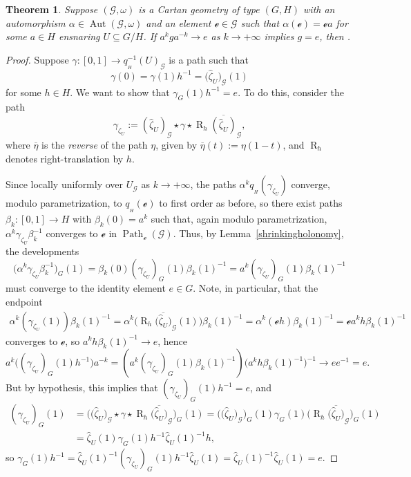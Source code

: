 \documentclass[pdftex]{sigma}
\numberwithin{equation}{section}
\newtheorem{Theorem}{Theorem}[section]
\theoremstyle{definition}
\DeclareMathOperator{\Hol}{\mathrm{Hol}}
\DeclareMathOperator{\Aut}{\mathrm{Aut}}
\DeclareMathOperator{\Path}{Path}
\newcommand{\Rt}[1]{\operatorname{R}_{#1}}
\begin{document}
\begin{Theorem}\label{ensnaringthm} Suppose $(\mathscr{G},\omega)$ is a Cartan geometry of type $(G,H)$ with an automorphism $\alpha\in\Aut(\mathscr{G},\omega)$ and an element $\mathscr{e}\in\mathscr{G}$ such that $\alpha(\mathscr{e})=\mathscr{e}a$ for some $a\in H$ ensnaring $U\subseteq G/H$. If $a^kga^{-k}\rightarrow e$ as $k\rightarrow+\infty$ implies $g=e$, then \smash{$\Hol_{(\hat{\zeta}_U)_\mathscr{G}(1)}\bigl(q_{{}_H}^{-1}(U)_\mathscr{G},\omega\bigr)=\{e\}$}.\end{Theorem}
\begin{proof}Suppose $\gamma \colon [0,1]\to q_{{}_H}^{-1}(U)_\mathscr{G}$ is a path such that \[\gamma(0)=\gamma(1)h^{-1}=\bigl(\hat{\zeta}_U\bigr)_\mathscr{G}(1)\] for some $h\in H$. We want to show that $\gamma_G(1)h^{-1}=e$. To do this, consider the path \[\gamma_{\zeta_U}:=(\hat{\zeta}_U)_\mathscr{G}\star\gamma\star\Rt{h}\overline{(\hat{\zeta}_U)}_\mathscr{G},\] where $\overline{\eta}$ is the \emph{reverse} of the path $\eta$, given by $\overline{\eta}(t):=\eta(1-t)$, and $\Rt{h}$ denotes right-translation by $h$.

Since  locally uniformly over $U_\mathscr{G}$ as $k\rightarrow +\infty$, the paths $\alpha^k q_{{}_H}(\gamma_{\zeta_U})$ converge, modulo parametrization, to $q_{{}_H}(\mathscr{e})$ to first order as before, so there exist paths $\beta_k\colon [0,1]\to H$ with $\beta_k(0)=a^k$ such that, again modulo parametrization, $\alpha^k\gamma_{\zeta_U}\beta_k^{-1}$ converges to $\mathscr{e}$ in $\Path_\mathscr{e}(\mathscr{G})$. Thus, by Lemma~\ref{shrinkingholonomy}, the developments
\[\bigl(\alpha^k\gamma_{\zeta_U}\beta_k^{-1}\bigr)_G(1) =\beta_k(0)(\gamma_{\zeta_U})_G(1)\beta_k(1)^{-1}=a^k(\gamma_{\zeta_U})_G(1)\beta_k(1)^{-1}\]
must converge to the identity element $e\in G$. Note, in particular, that the endpoint
\begin{align*}\alpha^k(\gamma_{\zeta_U}(1))\beta_k(1)^{-1}   =\alpha^k\bigl(\Rt{h}\overline{\bigl(\hat{\zeta}_U\bigr)}_\mathscr{G}(1)\bigr)\beta_k(1)^{-1}  =\alpha^k(\mathscr{e}h)\beta_k(1)^{-1}=\mathscr{e}a^kh\beta_k(1)^{-1}
\end{align*}
converges to $\mathscr{e}$, so $a^kh\beta_k(1)^{-1}\rightarrow e$, hence
\[a^k\bigl((\gamma_{\zeta_U})_G(1)h^{-1}\bigr)a^{-k} =(a^k(\gamma_{\zeta_U})_G(1)\beta_k(1)^{-1})\bigl(a^kh\beta_k(1)^{-1}\bigr)^{-1}\rightarrow ee^{-1}=e.\]
But by hypothesis, this implies that $(\gamma_{\zeta_U})_G(1)h^{-1}=e$, and
\begin{align*}(\gamma_{\zeta_U})_G(1) & =\bigl(\bigl(\hat{\zeta}_U\bigr)_\mathscr{G}\star\gamma\star\Rt{h}\overline{\bigl(\hat{\zeta}_U\bigr)}_\mathscr{G}\bigr)_G (1) =\bigl(\bigl(\hat{\zeta}_U\bigr)_\mathscr{G}\bigr)_G\!(1) \gamma_G(1)\bigl(\Rt{h}\overline{\bigl(\hat{\zeta}_U\bigr)}_\mathscr{G}\bigr)_G (1)
\\ & =\hat{\zeta}_U(1)\gamma_G(1)h^{-1}\hat{\zeta}_U(1)^{-1}h,
\end{align*} so $\gamma_G(1)h^{-1}=\hat{\zeta}_U(1)^{-1}(\gamma_{\zeta_U})_G(1)h^{-1}\hat{\zeta}_U(1)=\hat{\zeta}_U(1)^{-1}\hat{\zeta}_U(1)=e$.
\end{proof}
\end{document}
